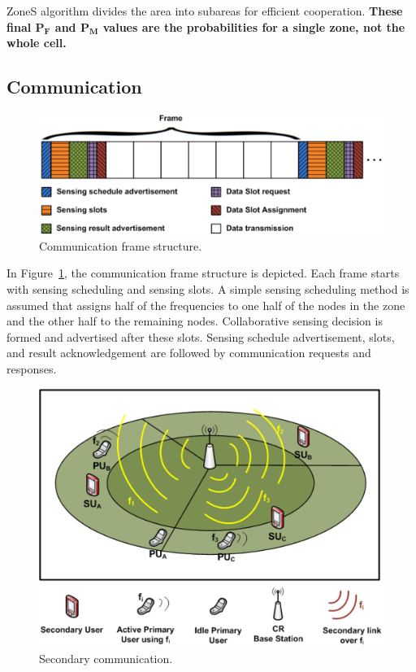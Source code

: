 \documentclass[conference,compsoc]{IEEEtran}
\newcommand{\probf}{\mathbf{P_F}}
\newcommand{\probm}{\mathbf{P_M}}
\begin{document}
ZoneS algorithm divides the area into subareas for efficient cooperation. \textbf{These final $\probf$ and $\probm$ values are the probabilities for a single zone, not the whole cell.}

\subsection{Communication}
\begin{figure}[!h]
\centering
\includegraphics[width=0.99\columnwidth,keepaspectratio] {figs/frameStructure.eps}
\caption{Communication frame structure.} \label{fig:frame_structure}
\end{figure}
In Figure~\ref{fig:frame_structure}, the communication frame structure is depicted. Each frame starts with sensing scheduling and sensing slots. A simple sensing scheduling method is assumed that assigns half of the frequencies to one half of the nodes in the zone and the other half to the remaining nodes. Collaborative sensing decision is formed and advertised after these slots. Sensing schedule advertisement, slots, and result acknowledgement are followed by communication requests and responses.

\begin{figure}[!ht]
\centering
\includegraphics[width=0.99\columnwidth,keepaspectratio] {figs/communicationCases.eps}
\caption{Secondary communication.} \label{fig:network}
\end{figure}
\end{document}
